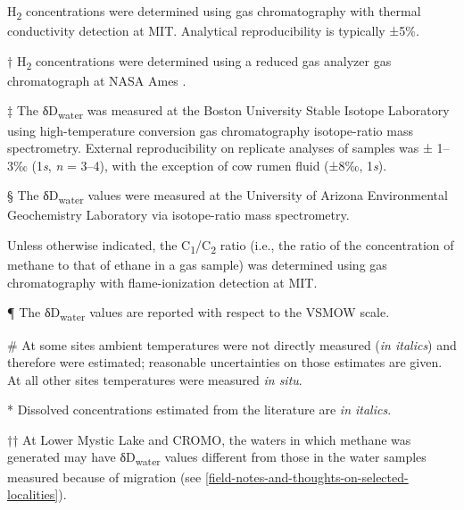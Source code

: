 \begin{table}
\begin{threeparttable}
		\begin{tablenotes}\small

			\item * H\textsubscript{2} concentrations were determined using gas
			chromatography with thermal conductivity detection at MIT. Analytical
			reproducibility is typically ±5\%.
			
			\item † H\textsubscript{2} concentrations were determined using a reduced
			gas analyzer gas chromatograph at NASA Ames \parencite{Crespo-Medina++_2014_FMicro}.
			
			\item ‡ The δD\textsubscript{water} was measured at the Boston
			University Stable Isotope Laboratory using high-temperature conversion
			gas chromatography isotope-ratio mass spectrometry. External
			reproducibility on replicate analyses of samples was ± 1--3‰ (1\emph{s},
			\emph{n} = 3--4), with the exception of cow rumen fluid (±8‰,
			1\emph{s}).
			
			\item § The δD\textsubscript{water} values were measured at the University of
			Arizona Environmental Geochemistry Laboratory via isotope-ratio mass
			spectrometry.
			
			\item \textbar{}\textbar{} Unless otherwise indicated, the
			C\textsubscript{1}/C\textsubscript{2} ratio (i.e., the ratio of the
			concentration of methane to that of ethane in a gas sample) was
			determined using gas chromatography with flame-ionization detection at
			MIT.
			
			\item ¶ The δD\textsubscript{water} values are reported with respect to the
			VSMOW scale.
			
			\item \# At some sites ambient temperatures were not directly measured
			(\emph{in italics}) and therefore were estimated; reasonable
			uncertainties on those estimates are given. At all other sites
			temperatures were measured \emph{in situ}.
			
			\item ** Dissolved  concentrations estimated from the literature are \emph{in italics}.
			
			\item †† At Lower Mystic Lake and CROMO, the waters in which methane was generated may have δD\textsubscript{water} values different from those in the water samples measured because of migration (see \autoref{field-notes-and-thoughts-on-selected-localities}).
			

\end{tablenotes}
\end{threeparttable}
\end{table}
